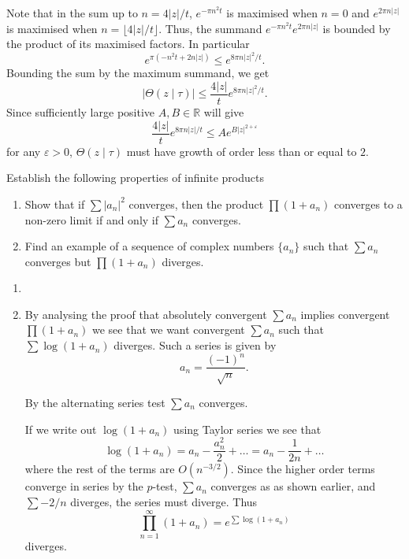 \documentclass[12 pt, letterpaper]{hmcpset}
\begin{document}
\begin{solution}
	Note that in the sum up to $n = 4 \lvert z \rvert / t$, $e^{- \pi n^{2} t}$ is maximised when $n = 0$ and $e^{2 \pi n \lvert z \rvert}$ is maximised when $n = \lfloor 4 \lvert z \rvert / t \rfloor$. Thus, the summand $e^{- \pi n^{2} t} e^{2 \pi n \lvert z \rvert}$ is bounded by the product of its maximised factors. In particular
	\[
		e^{\pi(-n^{2} t + 2 n \lvert z \rvert)} \le e^{8 \pi n \lvert z \rvert^{2} / t}.
	\]
	Bounding the sum by the maximum summand, we get
	\[
		\lvert \Theta(z \mid \tau) \rvert \le \frac{4 \lvert z \rvert}{t} e^{8 \pi n \lvert z \rvert^{2} / t}.
	\]
	Since sufficiently large positive $A, B \in \mathbb{R}$ will give
	\[
		\frac{4 \lvert z \rvert}{t} e^{8 \pi n \lvert z \rvert / t} \le A e^{B \lvert z \rvert^{2 + \varepsilon}}
	\]
	for any $\varepsilon > 0$, $\Theta(z \mid \tau)$ must have growth of order less than or equal to $2$.
\end{solution}

\pagebreak

\begin{problem}[7.]
	Establish the following properties of infinite products
	\begin{enumerate}
		\item Show that if $\sum \lvert a_{n} \rvert^{2}$ converges, then the product $\prod (1 + a_{n})$ converges to a non-zero limit if and only if $\sum a_{n}$ converges.
		\item Find an example of a sequence of complex numbers $\{ a_{n} \}$ such that $\sum a_{n}$ converges but $\prod (1 + a_{n})$ diverges.
	\end{enumerate}
\end{problem}

\begin{solution}
	\begin{enumerate}
		\item
		\item By analysing the proof that absolutely convergent $\sum a_{n}$  implies convergent  $\prod (1 + a_{n})$ we see that we want convergent $\sum a_{n}$ such that  $\sum \log (1 + a_{n})$ diverges. Such a series is given by
			\[
				a_{n} = \frac{(-1)^{n}}{\sqrt{n}}.
			\]

			By the alternating series test $\sum a_{n}$ converges.

			If we write out $\log(1 + a_{n})$ using Taylor series we see that
			 \[
				\log (1 + a_{n}) = a_{n} - \frac{a_{n}^{2}}{2} + \dots = a_{n} - \frac{1}{2n} + \dots
			\]
			where the rest of the terms are $O(n^{-3/2})$. Since the higher order terms converge in series by the  $p$-test, $\sum a_{n}$ converges as as shown earlier, and $\sum -2/n$ diverges, the series must diverge. Thus
			\[
				\prod_{n = 1}^{\infty} (1 + a_{n}) = e^{\sum \log(1 + a_{n})}
			\]
			diverges.
	\end{enumerate}
\end{solution}
\end{document}
